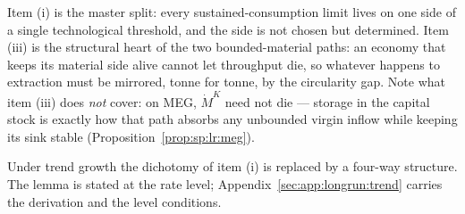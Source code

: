 Item (i) is the master split: every sustained-consumption limit lives on one side of a single
technological threshold, and the side is not chosen but determined. Item (iii) is the
structural heart of the two bounded-material paths: an economy that keeps its material side
alive cannot let throughput die, so whatever happens to extraction must be mirrored, tonne for
tonne, by the circularity gap. Note what item (iii) does \emph{not} cover: on MEG, $\dot M^K$
need not die --- storage in the capital stock is exactly how that path absorbs any unbounded
virgin inflow while keeping its sink stable (Proposition~\ref{prop:sp:lr:meg}).

Under trend growth the dichotomy of item (i) is replaced by a four-way structure. The lemma
is stated at the rate level; Appendix~\ref{sec:app:longrun:trend} carries the derivation and
the level conditions.

